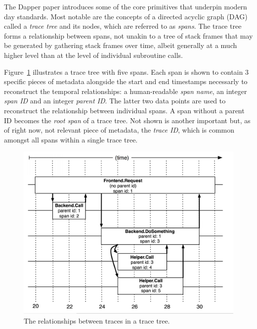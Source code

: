 \documentclass[pdftex,titlepage]{article}
\begin{document}
        The Dapper paper introduces some of the core primitives that underpin modern day standards. Most notable are the concepts
        of a directed acyclic graph (DAG) called a \textit{trace tree} and its nodes, which are referred to as \textit{spans}. 
        The trace tree forms a relationship between spans, not unakin to a tree of stack frames that may be generated by
        gathering stack frames over time, albeit generally at a much higher level than at the level of individual subroutine calls. 

        Figure~\ref{fig:dappertrace} illustrates a trace tree with five spans. Each span is shown to contain 3 specific pieces of
        metadata alongside the start and end timestamps necessarly to reconstruct the temporal relationships: a human-readable
        \textit{span name}, an integer \textit{span ID} and an integer \textit{parent ID}. The latter two
        data points are used to reconstruct the relationship between individual spans. A span without a parent ID becomes the 
        \textit{root span} of a trace tree. Not shown is another important but, as of right now, not relevant piece of metadata, the 
        \textit{trace ID}, which is common amongst all spans within a single trace tree.

        \begin{figure}[htb!]
            \centering
            \includegraphics[scale=0.9]{dappertrace}
            \caption{The relationships between traces in a trace tree.}
            \label{fig:dappertrace}
        \end{figure}
\end{document}
